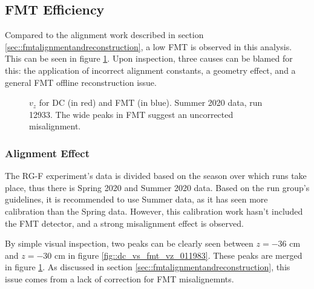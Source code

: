 \subsection{FMT Efficiency}

    Compared to the alignment work described in section \ref{sec::fmtalignmentandreconstruction}, a low FMT is observed in this analysis.
    This can be seen in figure \ref{fig::vz_012933}.
    Upon inspection, three causes can be blamed for this: the application of incorrect alignment constants, a geometry effect, and a general FMT offline reconstruction issue.

    \begin{figure}[b!]
        \centering{}
        \caption[$v_z$ for DC and FMT, run 12933]{$v_z$ for DC (in red) and FMT (in blue). Summer 2020 data, run 12933. The wide peaks in FMT suggest an uncorrected misalignment.}
        \label{fig::vz_012933}
    \end{figure}

    \subsubsection{Alignment Effect}
        The RG-F experiment's data is divided based on the season over which runs take place, thus there is Spring 2020 and Summer 2020 data.
        Based on the run group's guidelines, it is recommended to use Summer data, as it has seen more calibration than the Spring data.
        However, this calibration work hasn't included the FMT detector, and a strong misalignment effect is observed.

        By simple visual inspection, two peaks can be clearly seen between $z = -36$ cm and $z = -30$ cm in figure \ref{fig::dc_vs_fmt_vz_011983}.
        These peaks are merged in figure \ref{fig::vz_012933}.
        As discussed in section \ref{sec::fmtalignmentandreconstruction}, this issue comes from a lack of correction for FMT misalignemnts.

